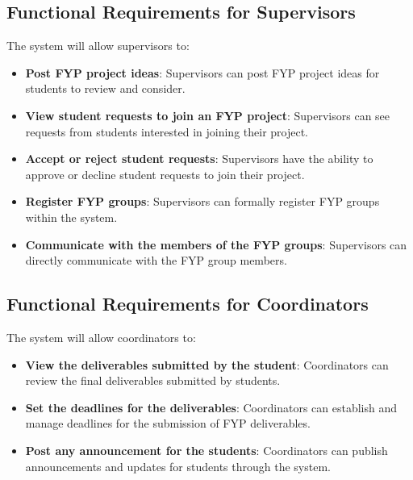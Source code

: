 \documentclass{FastFyp}
\begin{document}
\subsection{Functional Requirements for Supervisors}
The system will allow supervisors to:
\begin{itemize}
    \item \textbf{Post FYP project ideas}: Supervisors can post FYP project ideas for students to review and consider.
    \item \textbf{View student requests to join an FYP project}: Supervisors can see requests from students interested in joining their project.
    \item \textbf{Accept or reject student requests}: Supervisors have the ability to approve or decline student requests to join their project.
    \item \textbf{Register FYP groups}: Supervisors can formally register FYP groups within the system.
    \item \textbf{Communicate with the members of the FYP groups}: Supervisors can directly communicate with the FYP group members.
\end{itemize}

\subsection{Functional Requirements for Coordinators}
The system will allow coordinators to:
\begin{itemize}
    \item \textbf{View the deliverables submitted by the student}: Coordinators can review the final deliverables submitted by students.
    \item \textbf{Set the deadlines for the deliverables}: Coordinators can establish and manage deadlines for the submission of FYP deliverables.
    \item \textbf{Post any announcement for the students}: Coordinators can publish announcements and updates for students through the system.
\end{itemize}
\end{document}
